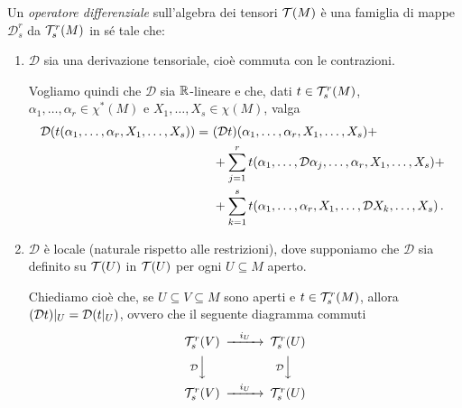 \begin{definition}  \label{def:OperatoreDifferenziale} %
	Un \emph{operatore differenziale} sull'algebra dei tensori $\mathcal T(M)$ è una famiglia di mappe $\mathcal D_s^r$ da $\mathcal T_s^r(M)$ in sé tale che:
	\begin{enumerate}
	 \item $\mathcal D$ sia una derivazione tensoriale, cioè commuta con le contrazioni. \label{od:Derivazione} %
	 
	 Vogliamo quindi che $\mathcal D$ sia $\mathbb R$-lineare e che, dati $t\in\mathcal T_s^r(M)$, $\alpha_1,\ldots,\alpha_r\in\chi^*(M)$ e $X_1,\ldots,X_s\in\chi(M)$, valga
	 \begin{align*}
	 	\mathcal D (t(\alpha_1,\ldots,\alpha_r,X_1,\ldots,X_s)) =\ & (\mathcal D t) (\alpha_1,\ldots,\alpha_r,X_1,\ldots,X_s) +\\
	 	&+\sum_{j=1}^r t(\alpha_1,\ldots,\mathcal D \alpha_j,\ldots, \alpha_r, X_1,\ldots, X_s) +\\
	 	&+\sum_{k=1}^s t(\alpha_1,\ldots, \alpha_r, X_1,\ldots, \mathcal D X_k,\ldots, X_s) \, \text{. }
	 \end{align*}

	\item $\mathcal D$ è locale (naturale rispetto alle restrizioni), dove supponiamo che $\mathcal D$ sia definito su $\mathcal T(U)$ in $\mathcal T(U)$ per ogni $U\subseteq M$ aperto. \label{od:Restrizioni} %
	
	Chiediamo cioè che, se $U\subseteq V \subseteq M$ sono aperti e $t\in\mathcal T_s^r(M)$, allora $(\mathcal D t)|_ U = \mathcal D (t|_ U)$, ovvero che il seguente diagramma commuti
	\begin{equation*}
	\begin{CD} 
	 \Tau_s^r(V) @>i_U>> \Tau_s^r(U) \\
	 @V\mathcal{D}VV  @V\mathcal{D}VV \\
	 \Tau_s^r(V) @>i_U>> \Tau_s^r(U) 
	\end{CD}
	\end{equation*}

	\end{enumerate}
\end{definition}

